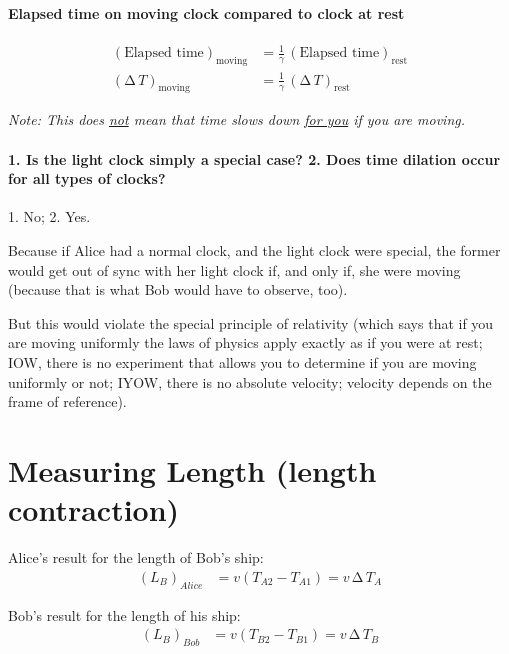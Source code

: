 \documentclass[pagesize,headsepline,10pt,parskip=half]{scrreprt}
\newcommand*\mdelta[1]{\ensuremath{\mathrm{\Delta\,}#1}}
\begin{document}
      \paragraph{Elapsed time on moving clock compared to clock at rest}
        \begin{align*}
          {\left(\text{Elapsed time}\right)}_{\text{moving}} &= \frac{1}{\gamma}\,{\left(\text{Elapsed time}\right)}_{\text{rest}}\\
          {\left(\mdelta{T}\right)}_{\text{moving}} &= \frac{1}{\gamma}\,{\left(\mdelta{T}\right)}_{\text{rest}}
        \end{align*}

        \emph{Note: This does \underline{not} mean that time slows down \underline{for you} if you are moving.}

      \paragraph{1. Is the light clock simply a special case?
        2. Does time dilation occur for all types of clocks?}
        1. No; 2. Yes.

        Because if Alice had a normal clock, and the light clock were special,
        the former would get out of sync with her light clock if, and only if,
        she were moving (because that is what Bob would have to observe, too).

        But this would violate the special principle of relativity (which says
        that if you are moving uniformly the laws of physics apply exactly as if
        you were at rest; IOW, there is no experiment that allows you
        to determine if you are moving uniformly or not; IYOW, there is no
        absolute velocity; velocity depends on the frame of reference).

    \section{Measuring Length (length contraction)}
      Alice’s result for the length of Bob’s ship:
      \begin{align*}
        {\left(L_B\right)}_{Alice} &= v \left(T_{A2} - T_{A1}\right) = v\,\mdelta{T_A}
      \end{align*}

      Bob’s result for the length of his ship:
      \begin{align*}
        {\left(L_B\right)}_{Bob} &= v \left(T_{B2} - T_{B1}\right) = v\,\mdelta{T_B}
      \end{align*}
\end{document}
